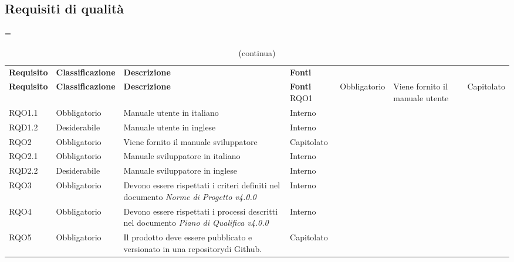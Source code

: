 \subsection{Requisiti di qualità}

\LTcapwidth=\linewidth
\begin{longtable}{ >{\centering}p{} >{\centering}p{}
		>{\raggedright}p{} >{\centering}p{}}
	\caption{Tabella dei requisiti di qualità}\\
	\rowcolorhead 
	\textbf{\color{white}Requisito} 
	& \textbf{\color{white}Classificazione} 
	& \centering\textbf{\color{white}Descrizione}
	& \textbf{\color{white}Fonti} 
	\endfirsthead
	\caption[]{(continua)}\\
	\rowcolorhead 
	\textbf{\color{white}Requisito} 
	& \textbf{\color{white}Classificazione} 
	& \centering\textbf{\color{white}Descrizione}
	& \textbf{\color{white}Fonti} 
	\endhead
	RQO1	&	Obbligatorio	&	Viene fornito il manuale utente	&	Capitolato	\tabularnewline
	RQO1.1	&	Obbligatorio	&	Manuale utente in italiano	&	Interno	\tabularnewline
	RQD1.2	&	Desiderabile	&	Manuale utente in inglese	&	Interno	\tabularnewline
	RQO2	&	Obbligatorio	&	Viene fornito il manuale sviluppatore	&	Capitolato	\tabularnewline
	RQO2.1	&	Obbligatorio	&		Manuale sviluppatore in italiano	&	Interno	\tabularnewline
	RQD2.2	&	Desiderabile	&		Manuale sviluppatore in inglese	&	Interno	\tabularnewline
	RQO3	&	Obbligatorio	&		Devono essere rispettati i criteri definiti nel documento \textit{Norme di Progetto v4.0.0}	&	Interno	\tabularnewline
	RQO4	& Obbligatorio	& 	Devono essere rispettati i processi descritti nel documento \textit{Piano di Qualifica v4.0.0} &	Interno \tabularnewline
	RQO5	&	Obbligatorio	&	Il prodotto deve essere pubblicato e versionato in una repository\glosp di Github\glo.	&	Capitolato
	\tabularnewline
	
\end{longtable}
	

